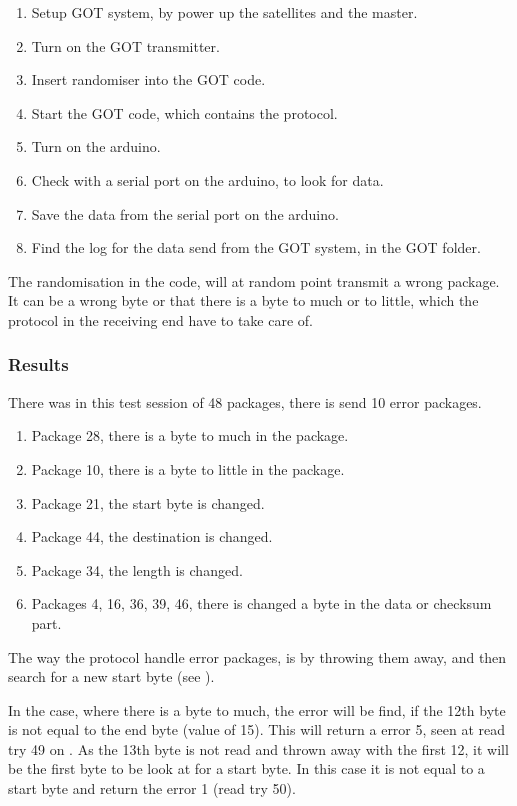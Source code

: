 \begin{enumerate}
  \item Setup GOT system, by power up the satellites and the master.
  \item Turn on the GOT transmitter.
  \item Insert randomiser into the GOT code.
  \item Start the GOT code, which contains the protocol.
  \item Turn on the arduino.
  \item Check with a serial port on the arduino, to look for data.
  \item Save the data from the serial port on the arduino.
  \item Find the log for the data send from the GOT system, in the GOT folder.
\end{enumerate}

The randomisation in the code, will at random point transmit a wrong package. It can be a wrong byte or that there is a byte to much or to little, which the protocol in the receiving end have to take care of.

\subsubsection{Results}

There was in this test session of 48 packages, there is send 10 error packages. 
\begin{enumerate}
\item Package 28, there is a byte to much in the package.
\item Package 10, there is a byte to little in the package.
\item Package 21, the start byte is changed.
\item Package 44, the destination is changed.
\item Package 34, the length is changed.
\item Packages 4, 16, 36, 39, 46, there is changed a byte in the data or checksum part.
\end{enumerate}

The way the protocol handle error packages, is by throwing them away, and then search for a new start byte (see \secref{}). 


In the case, where there is a byte to much, the error will be find, if the 12th byte is not equal to the end byte (value of 15). This will return a error 5, seen at read try 49 on \figref{}. As the 13th byte is not read and thrown away with the first 12, it will be the first byte to be look at for a start byte. In this case it is not equal to a start byte and return the error 1 (read try 50).

